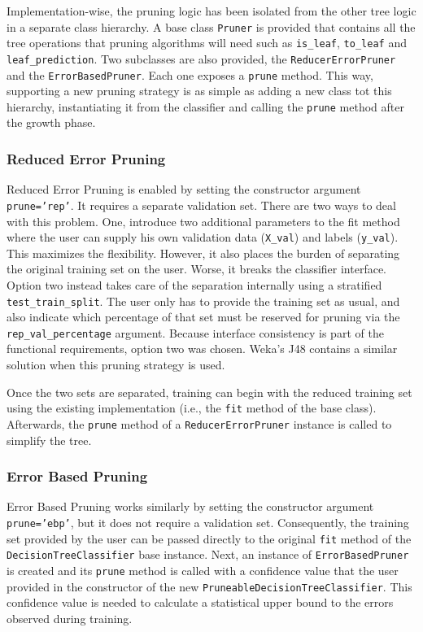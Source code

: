 Implementation-wise, the pruning logic has been isolated from the other tree logic in a separate class hierarchy. A base class \texttt{Pruner} is provided that contains all the tree operations that pruning algorithms will need such as \texttt{is\_leaf}, \texttt{to\_leaf} and \texttt{leaf\_prediction}. Two subclasses are also provided, the \texttt{ReducerErrorPruner} and the \texttt{ErrorBasedPruner}. Each one exposes a \texttt{prune} method. This way, supporting a new pruning strategy is as simple as adding a new class tot this hierarchy, instantiating it from the classifier and calling the \texttt{prune} method after the growth phase.

\subsubsection{Reduced Error Pruning}
Reduced Error Pruning is enabled by setting the constructor argument \texttt{prune='rep'}. It requires a separate validation set. There are two ways to deal with this problem. One, introduce two additional parameters to the fit method where the user can supply his own validation data (\texttt{X\_val}) and labels (\texttt{y\_val}). This maximizes the flexibility. However, it also places the burden of separating the original training set on the user. Worse, it breaks the classifier interface. Option two instead takes care of the separation internally using a stratified \texttt{test\_train\_split}. The user only has to provide the training set as usual, and also indicate which percentage of that set must be reserved for pruning via the \texttt{rep\_val\_percentage} argument. Because interface consistency is part of the functional requirements, option two was chosen. Weka's J48 contains a similar solution when this pruning strategy is used.

Once the two sets are separated, training can begin with the reduced training set using the existing implementation (i.e., the \texttt{fit} method of the base class). Afterwards, the \texttt{prune} method of a \texttt{ReducerErrorPruner} instance is called to simplify the tree.

\subsubsection{Error Based Pruning}
Error Based Pruning works similarly by setting the constructor argument \texttt{prune='ebp'}, but it does not require a validation set. Consequently, the training set provided by the user can be passed directly to the original \texttt{fit} method of the \texttt{DecisionTreeClassifier} base instance. Next, an instance of \texttt{ErrorBasedPruner} is created and its \texttt{prune} method is called with a confidence value that the user provided in the constructor of the new \texttt{PruneableDecisionTreeClassifier}. This confidence value is needed to calculate a statistical upper bound to the errors observed during training.

